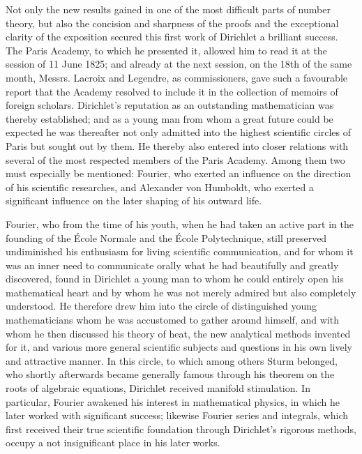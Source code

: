 \documentclass[11pt]{article}
\begin{document}
Not only the new results gained in one of the most difficult parts of number theory, but also the concision and sharpness of the proofs and the exceptional clarity of the exposition secured this first work of Dirichlet a brilliant success. The Paris Academy, to which he presented it, allowed him to read it at the session of 11 June 1825; and already at the next session, on the 18th of the same month, Messrs. Lacroix and Legendre, as commissioners, gave such a favourable report that the Academy resolved to include it in the collection of memoirs of foreign scholars. Dirichlet's reputation as an outstanding mathematician was thereby established; and as a young man from whom a great future could be expected he was thereafter not only admitted into the highest scientific circles of Paris but sought out by them. He thereby also entered into closer relations with several of the most respected members of the Paris Academy. Among them two must especially be mentioned: Fourier, who exerted an influence on the direction of his scientific researches, and Alexander von Humboldt, who exerted a significant influence on the later shaping of his outward life.

Fourier, who from the time of his youth, when he had taken an active part in the founding of the École Normale and the École Polytechnique, still preserved undiminished his enthusiasm for living scientific communication, and for whom it was an inner need to communicate orally what he had beautifully and greatly discovered, found in Dirichlet a young man to whom he could entirely open his mathematical heart and by whom he was not merely admired but also completely understood. He therefore drew him into the circle of distinguished young mathematicians whom he was accustomed to gather around himself, and with whom he then discussed his theory of heat, the new analytical methods invented for it, and various more general scientific subjects and questions in his own lively and attractive manner. In this circle, to which among others Sturm belonged, who shortly afterwards became generally famous through his theorem on the roots of algebraic equations, Dirichlet received manifold stimulation. In particular, Fourier awakened his interest in mathematical physics, in which he later worked with significant success; likewise Fourier series and integrals, which first received their true scientific foundation through Dirichlet's rigorous methods, occupy a not insignificant place in his later works.
\end{document}
